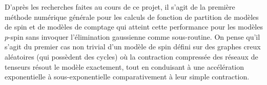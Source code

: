 D'après les recherches faites au cours de ce projet, il s'agit de la première méthode numérique générale pour les calculs de fonction de partition de modèles de spin et de modèles de comptage qui atteint cette performance pour les modèles $p$-spin sans invoquer l'élimination gaussienne comme sous-routine.
On pense qu'il s'agit du premier cas non trivial d'un modèle de spin défini sur des graphes creux aléatoires (qui possèdent des cycles) où la contraction compressée des réseaux de tenseurs résout le modèle exactement, tout en conduisant à une accélération exponentielle à sous-exponentielle comparativement à leur simple contraction.
